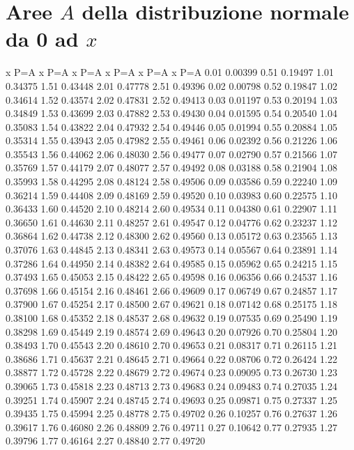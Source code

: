 \documentclass[onecolumn,11pt]{book}
\begin{document}
\section*{Aree $A$  della distribuzione normale da 0 ad $x$}
\oddsidemargin  0.0in
\evensidemargin 0.0in
\topmargin -0.4in
\small
\begin{Schunk}
\begin{Soutput}
    x     P=A    x     P=A    x     P=A    x     P=A    x     P=A    x     P=A
 0.01 0.00399 0.51 0.19497 1.01 0.34375 1.51 0.43448 2.01 0.47778 2.51 0.49396
 0.02 0.00798 0.52 0.19847 1.02 0.34614 1.52 0.43574 2.02 0.47831 2.52 0.49413
 0.03 0.01197 0.53 0.20194 1.03 0.34849 1.53 0.43699 2.03 0.47882 2.53 0.49430
 0.04 0.01595 0.54 0.20540 1.04 0.35083 1.54 0.43822 2.04 0.47932 2.54 0.49446
 0.05 0.01994 0.55 0.20884 1.05 0.35314 1.55 0.43943 2.05 0.47982 2.55 0.49461
 0.06 0.02392 0.56 0.21226 1.06 0.35543 1.56 0.44062 2.06 0.48030 2.56 0.49477
 0.07 0.02790 0.57 0.21566 1.07 0.35769 1.57 0.44179 2.07 0.48077 2.57 0.49492
 0.08 0.03188 0.58 0.21904 1.08 0.35993 1.58 0.44295 2.08 0.48124 2.58 0.49506
 0.09 0.03586 0.59 0.22240 1.09 0.36214 1.59 0.44408 2.09 0.48169 2.59 0.49520
 0.10 0.03983 0.60 0.22575 1.10 0.36433 1.60 0.44520 2.10 0.48214 2.60 0.49534
 0.11 0.04380 0.61 0.22907 1.11 0.36650 1.61 0.44630 2.11 0.48257 2.61 0.49547
 0.12 0.04776 0.62 0.23237 1.12 0.36864 1.62 0.44738 2.12 0.48300 2.62 0.49560
 0.13 0.05172 0.63 0.23565 1.13 0.37076 1.63 0.44845 2.13 0.48341 2.63 0.49573
 0.14 0.05567 0.64 0.23891 1.14 0.37286 1.64 0.44950 2.14 0.48382 2.64 0.49585
 0.15 0.05962 0.65 0.24215 1.15 0.37493 1.65 0.45053 2.15 0.48422 2.65 0.49598
 0.16 0.06356 0.66 0.24537 1.16 0.37698 1.66 0.45154 2.16 0.48461 2.66 0.49609
 0.17 0.06749 0.67 0.24857 1.17 0.37900 1.67 0.45254 2.17 0.48500 2.67 0.49621
 0.18 0.07142 0.68 0.25175 1.18 0.38100 1.68 0.45352 2.18 0.48537 2.68 0.49632
 0.19 0.07535 0.69 0.25490 1.19 0.38298 1.69 0.45449 2.19 0.48574 2.69 0.49643
 0.20 0.07926 0.70 0.25804 1.20 0.38493 1.70 0.45543 2.20 0.48610 2.70 0.49653
 0.21 0.08317 0.71 0.26115 1.21 0.38686 1.71 0.45637 2.21 0.48645 2.71 0.49664
 0.22 0.08706 0.72 0.26424 1.22 0.38877 1.72 0.45728 2.22 0.48679 2.72 0.49674
 0.23 0.09095 0.73 0.26730 1.23 0.39065 1.73 0.45818 2.23 0.48713 2.73 0.49683
 0.24 0.09483 0.74 0.27035 1.24 0.39251 1.74 0.45907 2.24 0.48745 2.74 0.49693
 0.25 0.09871 0.75 0.27337 1.25 0.39435 1.75 0.45994 2.25 0.48778 2.75 0.49702
 0.26 0.10257 0.76 0.27637 1.26 0.39617 1.76 0.46080 2.26 0.48809 2.76 0.49711
 0.27 0.10642 0.77 0.27935 1.27 0.39796 1.77 0.46164 2.27 0.48840 2.77 0.49720

\end{Soutput}
\end{Schunk}
\end{document}
